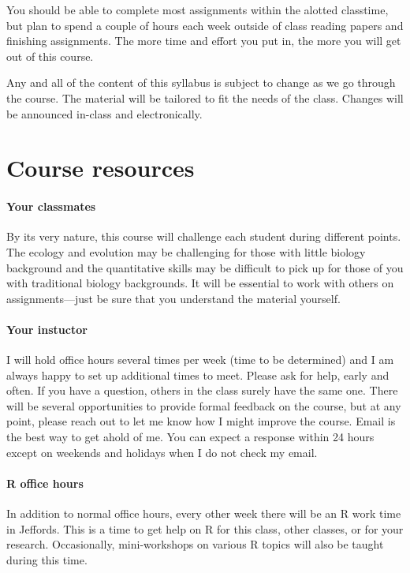 \documentclass[12pt,]{article}
\let\oldparagraph\paragraph
\renewcommand{\paragraph}[1]{\oldparagraph{#1}\mbox{}}
\begin{document}
You should be able to complete most assignments within the alotted
classtime, but plan to spend a couple of hours each week outside of
class reading papers and finishing assignments. The more time and effort
you put in, the more you will get out of this course.

Any and all of the content of this syllabus is subject to change as we
go through the course. The material will be tailored to fit the needs of
the class. Changes will be announced in-class and electronically.

\section{Course resources}\label{course-resources}

\paragraph{Your classmates}\label{your-classmates}

By its very nature, this course will challenge each student during
different points. The ecology and evolution may be challenging for those
with little biology background and the quantitative skills may be
difficult to pick up for those of you with traditional biology
backgrounds. It will be essential to work with others on
assignments---just be sure that you understand the material yourself.

\paragraph{Your instuctor}\label{your-instuctor}

I will hold office hours several times per week (time to be determined)
and I am always happy to set up additional times to meet. Please ask for
help, early and often. If you have a question, others in the class
surely have the same one. There will be several opportunities to provide
formal feedback on the course, but at any point, please reach out to let
me know how I might improve the course. Email is the best way to get
ahold of me. You can expect a response within 24 hours except on
weekends and holidays when I do not check my email.

\paragraph{R office hours}\label{r-office-hours}

In addition to normal office hours, every other week there will be an R
work time in Jeffords. This is a time to get help on R for this class,
other classes, or for your research. Occasionally, mini-workshops on
various R topics will also be taught during this time.
\end{document}
